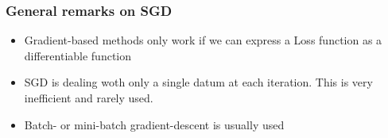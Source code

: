 \subsubsection{General remarks on SGD}
\begin{itemize}
    \item Gradient-based methods only work if we can express a Loss function as a differentiable function
    \item SGD is dealing woth only a single datum at each iteration. This is very inefficient and rarely used.
    \item Batch- or mini-batch gradient-descent is usually used
\end{itemize}